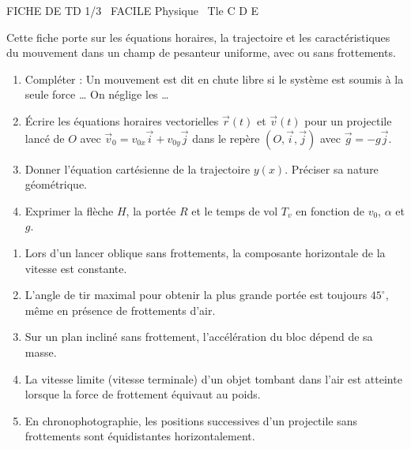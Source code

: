 \documentclass[11pt]{article}
\begin{document}
\begin{tcolorbox}[enhanced,colback=popink,colframe=popink,arc=10pt,boxrule=0pt,left=12pt,right=12pt,top=9pt,bottom=9pt]
{\color{white}\popxbold\small FICHE DE TD 1/3 \textbullet\ FACILE \hfill Physique \textbullet\ Tle C D E\par}
\end{tcolorbox}
\vspace{4pt}
Cette fiche porte sur les équations horaires, la trajectoire et les caractéristiques du mouvement dans un champ de pesanteur uniforme, avec ou sans frottements.

\begin{exercice}
\begin{enumerate}
    \item Compléter : Un mouvement est dit \og{} en chute libre \fg{} si le système est soumis à la seule force \ldots{} On néglige les \ldots{}
    \item Écrire les équations horaires vectorielles $\vec{r}(t)$ et $\vec{v}(t)$ pour un projectile lancé de $O$ avec $\vec{v}_0 = v_{0x}\vec{i} + v_{0y}\vec{j}$ dans le repère $(O, \vec{i}, \vec{j})$ avec $\vec{g} = -g\vec{j}$.
    \item Donner l'équation cartésienne de la trajectoire $y(x)$. Préciser sa nature géométrique.
    \item Exprimer la flèche $H$, la portée $R$ et le temps de vol $T_v$ en fonction de $v_0$, $\alpha$ et $g$.
\end{enumerate}
\end{exercice}

\begin{exercice}
\begin{enumerate}
    \item Lors d'un lancer oblique sans frottements, la composante horizontale de la vitesse est constante.
    \item L'angle de tir maximal pour obtenir la plus grande portée est toujours $45^\circ$, même en présence de frottements d'air.
    \item Sur un plan incliné sans frottement, l'accélération du bloc dépend de sa masse.
    \item La vitesse limite (vitesse terminale) d'un objet tombant dans l'air est atteinte lorsque la force de frottement équivaut au poids.
    \item En chronophotographie, les positions successives d'un projectile sans frottements sont équidistantes horizontalement.
\end{enumerate}
\end{exercice}
\end{document}
